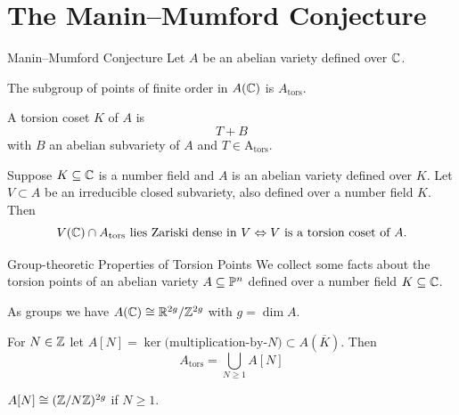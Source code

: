 \documentclass{beamer}
\begin{document}
\section{The Manin--Mumford Conjecture}

\begin{frame}{Manin--Mumford Conjecture}
  Let $A$ be an abelian variety defined over ${\mathbb{C}}$.
  
  \begin{definition}
    The subgroup of points of finite order in $A({\mathbb{C}})$ is
    $A_{\mathrm{tors}}$.
    
    A \alert{torsion coset} $K$ of $A$
    is
    $$ T+B $$
    with $B$ an abelian subvariety of $A$ and $T\in\mathrm{A}_{\mathrm{tors}}$. 
  \end{definition}

  \begin{theorem}

  Suppose $K\subseteq{\mathbb{C}}$ is a number field and $A$ is an abelian
  variety defined over $K$. 
  Let $V\subset A$ be an irreducible closed subvariety, also defined over a
  number field $K$. Then
  \begin{equation*}
    V({\mathbb{C}}) \cap A_{\mathrm{tors}} \text{ lies Zariski dense in
      $V$}\Leftrightarrow 
    \text{$V$ is a torsion coset of $A$.}
  \end{equation*}
\end{theorem}
\end{frame}


\begin{frame}{Group-theoretic Properties of Torsion Points} 
  We collect some facts about the torsion points of an
  abelian variety $A\subseteq{\mathbb{P}}^n$ defined over a number field
  $K\subseteq {\mathbb{C}}$.

  As groups we have $A({\mathbb{C}}) \cong {\mathbb{R}}^{2g}/{\mathbb{Z}}^{2g}$ with $g=\dim A$.

  For $N\in{\mathbb{Z}}$ let $A[N] = \ker \text{(multiplication-by-$N$)}
  \subset A(\overline K)$.
  Then
  \begin{equation*}
    A_{\mathrm{tors}} = \bigcup_{N\ge 1} A[N]
  \end{equation*}
  \begin{lemma}
    $A[N] \cong ({\mathbb{Z}}/N{\mathbb{Z}})^{2g}$ if $N\ge 1$.  
  \end{lemma}
\end{frame}
\end{document}

